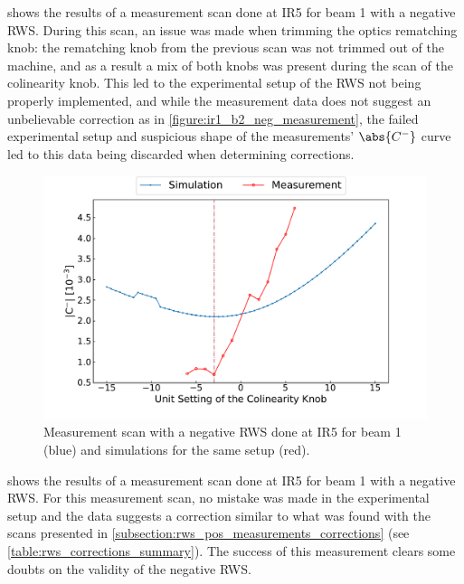  shows the results of a measurement scan done at IR\num{5} for beam \num{1} with a negative RWS.
During this scan, an issue was made when trimming the optics rematching knob: the rematching knob from the previous scan was not trimmed out of the machine, and as a result a mix of both knobs was present during the scan of the colinearity knob.
This led to the experimental setup of the RWS not being properly implemented, and while the measurement data does not suggest an unbelievable correction as in \cref{figure:ir1_b2_neg_measurement}, the failed experimental setup and suspicious shape of the measurements' \(\abs{C^{-}}\) curve led to this data being discarded when determining corrections.

\begin{figure}[!htb]
    \centering
    \includegraphics*[width=\textwidth]{Figures/Appendices/rws_measurement_ir5_b1_neg.pdf}
    \caption{Measurement scan with a negative RWS done at IR\num{5} for beam \num{1} (\textcolor{mplblue}{blue}) and simulations for the same setup (\textcolor{mplr}{red}).}
    \label{figure:ir5_b1_neg_measurement}
\end{figure}

 shows the results of a measurement scan done at IR\num{5} for beam \num{1} with a negative RWS.
For this measurement scan, no mistake was made in the experimental setup and the data suggests a correction similar to what was found with the scans presented in \cref{subsection:rws_pos_measurements_corrections} (see \cref{table:rws_corrections_summary}).
The success of this measurement clears some doubts on the validity of the negative \acrshort{RWS}.

